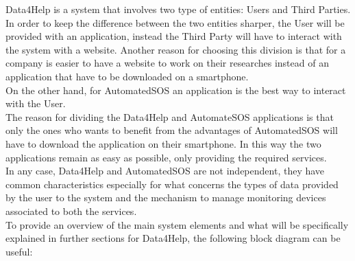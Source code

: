 


{}
\setlength{\parskip}{0.5cm}
Data4Help is a system that involves two type of entities: Users and Third Parties. In order to keep the difference between the two entities sharper, the User will be provided with an application, instead the Third Party will have to interact with the system with a website. Another reason for choosing this division is that for a company is easier to have a website to work on their researches instead of an application that have to be downloaded on a smartphone.\\
On the other hand, for AutomatedSOS an application is the best way to interact with the User.\\
The reason for dividing the Data4Help and AutomateSOS applications is that only the ones who wants to benefit from the advantages of AutomatedSOS will have to download the application on their smartphone. In this way the two applications remain as easy as possible, only providing the required services.\\
In any case, Data4Help and AutomatedSOS are not independent, they have common characteristics especially for what concerns the types of data provided by the user to the system and the mechanism to manage monitoring devices associated to both the services. \\
To provide an overview of the main system elements and what will be specifically explained in further sections for Data4Help, the following block diagram can be useful:\\

